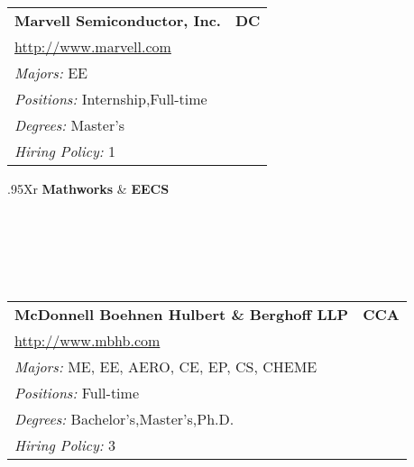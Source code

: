 \documentclass[twoside]{article}
\begin{document}
\begin{center}
\begin{multicols}{3}
\begin{FlushLeft}
\begin{minipage}{\columnwidth}
\end{minipage}
 
\begin{minipage}{\columnwidth}\begin{tabularx}{.95\columnwidth}{Xr}
                 {\Large\bf Marvell Semiconductor, Inc.} & {\Large\bf DC}\\
    \multicolumn{2}{p{.95\columnwidth}}{\url{http://www.marvell.com}}\\
    \multicolumn{2}{p{.95\columnwidth}}{\emph{Majors:} EE}\\
    \multicolumn{2}{p{.95\columnwidth}}{\emph{Positions:} Internship,Full-time}\\
    \multicolumn{2}{p{.95\columnwidth}}{\emph{Degrees:} Master's}\\
    \multicolumn{2}{p{.95\columnwidth}}{\emph{Hiring Policy:} 1}\\
    \end{tabularx}
    
\end{minipage}
 
\begin{minipage}{\columnwidth}\begin{tabularx}{.95\columnwidth}{Xr}
                 {\Large\bf Mathworks} & {\Large\bf EECS}\\
    \\
    \\
    \\
    \\
    \\
    \end{tabularx}
    
\end{minipage}
 
\begin{minipage}{\columnwidth}\begin{tabularx}{.95\columnwidth}{Xr}
                 {\Large\bf McDonnell Boehnen Hulbert \& Berghoff LLP} & {\Large\bf CCA}\\
    \multicolumn{2}{p{.95\columnwidth}}{\url{http://www.mbhb.com}}\\
    \multicolumn{2}{p{.95\columnwidth}}{\emph{Majors:} ME, EE, AERO, CE, EP, CS, CHEME}\\
    \multicolumn{2}{p{.95\columnwidth}}{\emph{Positions:} Full-time}\\
    \multicolumn{2}{p{.95\columnwidth}}{\emph{Degrees:} Bachelor's,Master's,Ph.D.}\\
    \multicolumn{2}{p{.95\columnwidth}}{\emph{Hiring Policy:} 3}\\
    \end{tabularx}
    

\end{minipage}
\end{FlushLeft}
\end{multicols}
\end{center}
\end{document}
